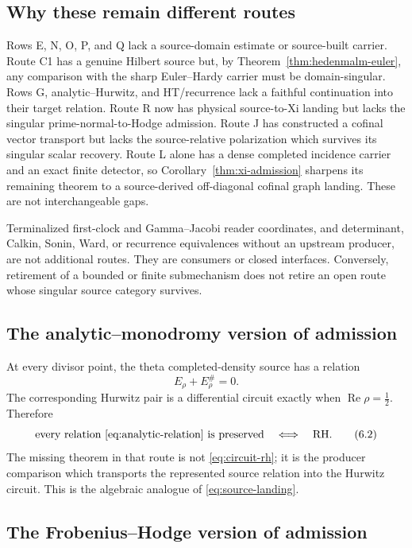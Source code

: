 \documentclass[11pt]{article}
\theoremstyle{definition}
\theoremstyle{remark}
\newcommand{\Rea}{\operatorname{Re}}
\begin{document}
\subsection{Why these remain different routes}

Rows E, N, O, P, and Q lack a source-domain estimate or source-built
carrier.  Route C1 has a genuine Hilbert source but, by
Theorem~\ref{thm:hedenmalm-euler}, any comparison with the sharp
Euler--Hardy carrier must be domain-singular.  Rows G,
analytic--Hurwitz, and HT/recurrence lack a faithful continuation into
their target relation.  Route R now has physical source-to-Xi landing but
lacks the singular prime-normal-to-Hodge admission.  Route J has constructed a
cofinal vector transport but lacks the source-relative polarization which
survives its singular scalar recovery.  Route L alone has a dense
completed incidence carrier and an exact finite detector, so
Corollary~\ref{thm:xi-admission} sharpens its remaining theorem to a
source-derived off-diagonal cofinal graph landing.  These are not
interchangeable gaps.

Terminalized first-clock and Gamma--Jacobi reader coordinates, and
determinant, Calkin, Sonin, Ward, or recurrence equivalences without an
upstream producer, are not additional routes.  They are consumers or
closed interfaces.  Conversely, retirement of a bounded or finite
submechanism does not retire an open route whose singular source category
survives.

\subsection{The analytic--monodromy version of admission}

At every divisor point, the theta completed-density source has a relation
\[
                         E_\rho+E_\rho^\#=0.
\tag{6.1}\label{eq:analytic-relation}
\]
The corresponding Hurwitz pair is a differential circuit exactly when
\(\Rea\rho=\tfrac12\).  Therefore
\[
 \text{every relation \eqref{eq:analytic-relation} is preserved}
 \quad\Longleftrightarrow\quad \mathrm{RH}.
\tag{6.2}\label{eq:circuit-rh}
\]
The missing theorem in that route is not \eqref{eq:circuit-rh}; it is the
producer comparison which transports the represented source relation into
the Hurwitz circuit.  This is the algebraic analogue of
\eqref{eq:source-landing}.

\subsection{The Frobenius--Hodge version of admission}
\end{document}
